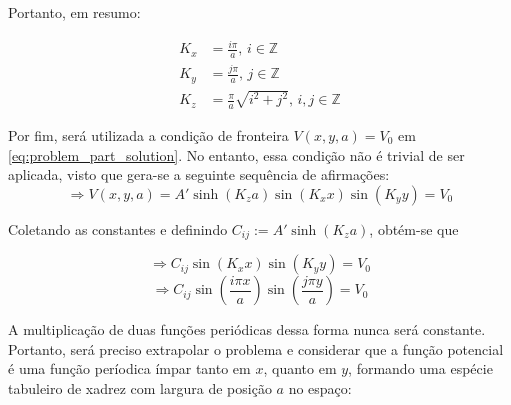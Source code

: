 \documentclass{report}
\begin{document}
Portanto, em resumo:

\vspace*{-1.5\baselineskip}
\begin{center}
  \begin{align}
    \label{eq:Kx_values}
    K_x &= \frac{i\pi}{a},\, i \in \mathbb{Z} \\
    \label{eq:Ky_values}
    K_y &= \frac{j\pi}{a},\, j \in \mathbb{Z} \\
    \label{eq:Kz_values}
    K_z &= \frac{\pi}{a}\sqrt{i^2 + j^2},\, i, j \in \mathbb{Z}
  \end{align}
\end{center}

Por fim, será utilizada a condição de fronteira $ V(x, y, a) = V_0 $ em \ref{eq:problem_part_solution}.
No entanto, essa condição não é trivial de ser aplicada, visto que gera-se
a seguinte sequência de afirmações:
$$ \Rightarrow V(x, y, a) = A'\sinh(K_za)\sin(K_xx)\sin(K_yy) = V_0 $$

Coletando as constantes e definindo $ C_{ij} := A'\sinh(K_za) $, obtém-se que

$$ \Rightarrow C_{ij}\sin(K_xx)\sin(K_yy) = V_0 $$
$$ \Rightarrow C_{ij}\sin\left(\frac{i\pi x}{a}\right)\sin\left(\frac{j\pi y}{a}\right) = V_0 $$

A multiplicação de duas funções periódicas dessa forma nunca será constante. Portanto, será
preciso extrapolar o problema e considerar que a função potencial é uma função períodica ímpar tanto em
$ x $, quanto em $ y $, formando uma espécie tabuleiro de xadrez com largura de posição $ a $ no espaço:
\end{document}
